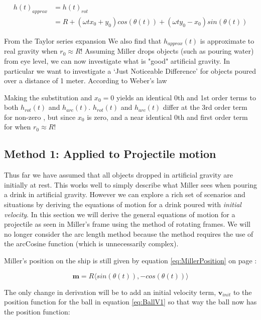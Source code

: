 \documentclass{amsart}
\renewcommand{\vec}{\textbf}
\theoremstyle{definition}
\begin{document}
\begin{equation}\label{eq:approxGravHeight}
\begin{split}
    h(t)_{approx} &= h(t)_{rot} \\
    &=R+(\omega t x_0 + y_0)cos(\theta(t))+(\omega t y_0 - x_0)sin(\theta (t))
\end{split}
\end{equation}

From the Taylor series expansion We also find that $h_{approx}(t)$ is approximate to real gravity when $r_0 \approx R$! Assuming Miller drops objects (such as pouring water) from eye level, we can now investigate what is "good" artificial gravity. In particular we want to investigate a `Just Noticeable Difference' for objects poured over a distance of 1 meter. According to Weber's law

Making the substitution  and $x_0 =0$ yields an identical 0th and 1st order terms to both $h_{rot}(t)$ and $h_{arc}(t)$. $h_{rot}(t)$ and $h_{arc}(t)$ differ at the 3rd order term for non-zero , but since $x_0$ is zero,  and a near identical 0th and first order term for  when $r_0 \approx R$! 


\subsection*{Method 1: Applied to Projectile motion}
Thus far we have assumed that all objects dropped in artificial
gravity are initially at rest. This works well to simply describe what
Miller sees when pouring a drink in artificial gravity. However we can
explore a rich set of scenarios and situations by deriving the
equations of motion for a drink poured with \textit{initial
  velocity}. In this section we will derive the general equations of
motion for a projectile as seen in Miller's frame using the method of
rotating frames. We will no longer consider the arc length method
because the method requires the use of the arcCosine function (which
is unnecessarily complex).


Miller's position on the ship is still given by equation
\ref{eq:MillerPosition} on page \pageref{eq:MillerPosition}:

\[\vec{m} = R\langle sin(\theta (t) ), - cos (\theta (t) ) \rangle\]

The only change in derivation will be to add an initial velocity term,
$\vec{v}_{init}$ to the position function for the ball in equation
\ref{eq:BallV1} so that way the ball now has the position function:
\end{document}
